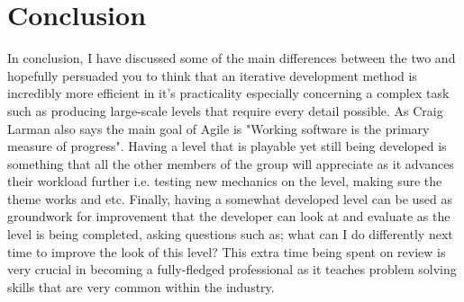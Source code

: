 \documentclass{scrartcl}
\begin{document}
\section{Conclusion}

In conclusion, I have discussed some of the main differences between the two and hopefully persuaded you to think that an iterative development method is incredibly more efficient in it's practicality especially concerning a complex task such as producing large-scale levels that require every detail possible. As \cite{8} Craig Larman also says the main goal of Agile is "Working software is the primary measure of progress". Having a level that is playable yet still being developed is something that all the other members of the group will appreciate as it advances their workload further i.e. testing new mechanics on the level, making sure the theme works and etc. Finally, having a somewhat developed level can be used as groundwork for improvement that the developer can look at and evaluate as the level is being completed, asking questions such as; what can I do differently next time to improve the look of this level? This extra time being spent on review is very crucial in becoming a fully-fledged professional as it teaches problem solving skills that are very common within the industry.




\end{document}
